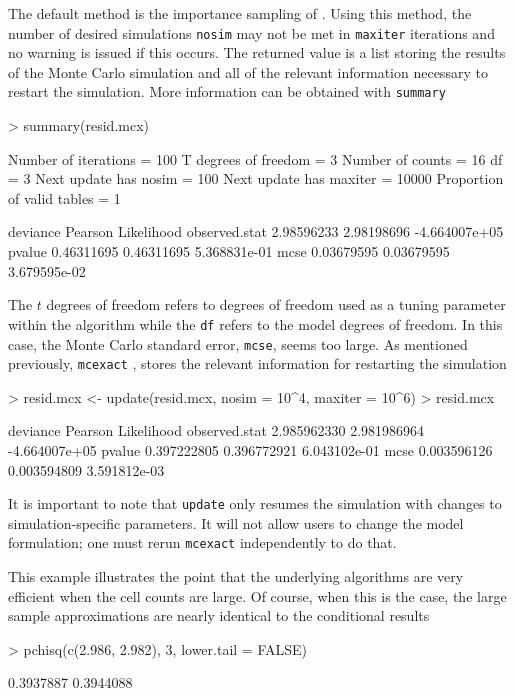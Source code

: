 \documentclass[a4paper]{article}
\newcommand{\mcexact}{\texttt{mcexact} }
\begin{document}
The default method is the importance sampling of
\cite{booth:butler:1999}. Using this method, the number of desired
simulations \texttt{nosim} may not be met in \texttt{maxiter}
iterations and no warning is issued if this occurs. The returned value
is a list storing the results of the Monte Carlo simulation and all of
the relevant information necessary to restart the simulation.  More
information can be obtained with \texttt{summary}
\begin{Schunk}
\begin{Sinput}
> summary(resid.mcx)
\end{Sinput}
\begin{Soutput}
Number of iterations       =  100 
T degrees of freedom       =  3 
Number of counts           =  16 
df                         =  3 
Next update has nosim      =  100 
Next update has maxiter    =  10000 
Proportion of valid tables =  1 

                deviance    Pearson    Likelihood
observed.stat 2.98596233 2.98198696 -4.664007e+05
pvalue        0.46311695 0.46311695  5.368831e-01
mcse          0.03679595 0.03679595  3.679595e-02
\end{Soutput}
\end{Schunk}
The $t$ degrees of freedom refers to degrees of freedom used as a
tuning parameter within the algorithm while the \texttt{df} refers to
the model degrees of freedom. In this case, the Monte Carlo standard
error, \texttt{mcse}, seems too large. As mentioned previously,
\mcexact, stores the relevant information for restarting the
simulation
\begin{Schunk}
\begin{Sinput}
> resid.mcx <- update(resid.mcx, nosim = 10^4, maxiter = 10^6)
> resid.mcx
\end{Sinput}
\begin{Soutput}
                 deviance     Pearson    Likelihood
observed.stat 2.985962330 2.981986964 -4.664007e+05
pvalue        0.397222805 0.396772921  6.043102e-01
mcse          0.003596126 0.003594809  3.591812e-03
\end{Soutput}
\end{Schunk}
It is important to note that \texttt{update} only resumes the
simulation with changes to simulation-specific parameters. It will not
allow users to change the model formulation; one must rerun \mcexact 
independently to do that.

This example illustrates the point that the underlying algorithms are
very efficient when the cell counts are large. Of course, when this is
the case, the large sample approximations are nearly identical to the
conditional results
\begin{Schunk}
\begin{Sinput}
> pchisq(c(2.986, 2.982), 3, lower.tail = FALSE)
\end{Sinput}
\begin{Soutput}
[1] 0.3937887 0.3944088
\end{Soutput}
\end{Schunk}
\end{document}
